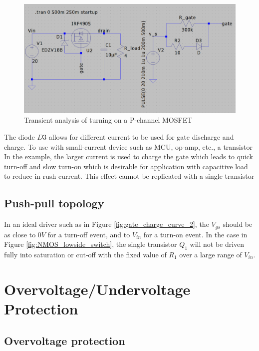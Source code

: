 \documentclass[main.tex]{subfiles}
\begin{document}
    \begin{figure}[!h]
        \centerline{\includegraphics[width=\linewidth, height=0.5\linewidth]{media/ideal_gate_drive.png}}
        \caption{Transient analysis of turning on a P-channel MOSFET}
        \label{fig:ideal_gate_drive}
    \end{figure}

    \justify
    The diode $D3$ allows for different current to be used for gate discharge and charge. To use with small-current device such as MCU, op-amp, etc., a transistor In the example, the larger current is used to charge the gate which leads to quick turn-off and slow turn-on which is desirable for application with capacitive load to reduce in-rush current. This effect cannot be replicated with a single transistor

    \pagebreak
    \subsection{Push-pull topology}

    \justify
    In an ideal driver such as in Figure \ref{fig:gate_charge_curve_2}, the $V_{gs}$ should be as close to $0V$ for a turn-off event, and to $V_{in}$ for a turn-on event. In the case in Figure \ref{fig:NMOS_lowside_switch}, the single transistor $Q_1$ will not be driven fully into saturation or cut-off with the fixed value of $R_1$ over a large range of $V_{in}$. 

    
    \pagebreak

    \section{Overvoltage/Undervoltage Protection}

    \subsection{Overvoltage protection}
\end{document}
